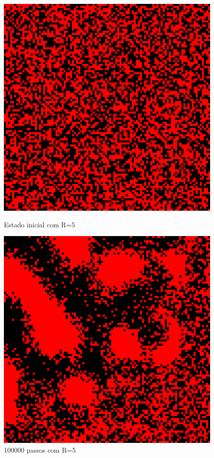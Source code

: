 \documentclass[conference]{IEEEtran}
\begin{document}
\begin{figure}[h!]
  \begin{minipage}[b]{0.5\linewidth}
    \label{fig:r5}
    \centering
    \includegraphics[width=.8\linewidth]{resultados/5-0.png}
    \caption{Estado inicial com R=5}
    \vspace{4ex}
  \end{minipage}%
  \begin{minipage}[b]{0.5\linewidth}
    \centering
    \includegraphics[width=.8\linewidth]{resultados/5-1.png}
    \caption{100000 passos com R=5}
    \vspace{4ex}

\end{minipage}
\end{figure}
\end{document}
